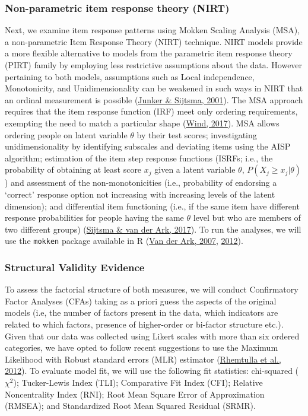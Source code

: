 \documentclass[
  ,doc,11pt, twoside,floatsintext]{apa6}
\begin{document}
\hypertarget{non-parametric-item-response-theory-nirt}{%
\subsubsection{Non-parametric item response theory (NIRT)}\label{non-parametric-item-response-theory-nirt}}

Next, we examine item response patterns using Mokken Scaling Analysis (MSA), a non-parametric Item Response Theory (NIRT) technique. NIRT models provide a more flexible alternative to models from the parametric item response theory (PIRT) family by employing less restrictive assumptions about the data. However pertaining to both models, assumptions such as Local independence, Monotonicity, and Unidimensionality can be weakened in such ways in NIRT that an ordinal measurement is possible (\protect\hyperlink{ref-junker2001}{Junker \& Sijtsma, 2001}). The MSA approach requires that the item response function (IRF) meet only ordering requirements, exempting the need to match a particular shape (\protect\hyperlink{ref-wind2017}{Wind, 2017}). MSA allows ordering people on latent variable \(\theta\) by their test scores; investigating unidimensionality by identifying subscales and deviating items using the AISP algorithm; estimation of the item step response functions (ISRFs; i.e., the probability of obtaining at least score \(x_j\) given a latent variable \(\theta\), \(P(X_j \ge x_j|\theta)\)) and assessment of the non-monotonicities (i.e., probability of endorsing a `correct' response option not increasing with increasing levels of the latent dimension); and differential item functioning (i.e., if the same item have different response probabilities for people having the same \(\theta\) level but who are members of two different groups) (\protect\hyperlink{ref-sijtsma2017}{Sijtsma \& van der Ark, 2017}). To run the analyses, we will use the \texttt{mokken} package available in R (\protect\hyperlink{ref-ark2007}{Van der Ark, 2007}, \protect\hyperlink{ref-ark2012}{2012}).

\hypertarget{structural-validity-evidence}{%
\subsubsection{Structural Validity Evidence}\label{structural-validity-evidence}}

To assess the factorial structure of both measures, we will conduct Confirmatory Factor Analyses (CFAs) taking as a priori guess the aspects of the original models (i.e, the number of factors present in the data, which indicators are related to which factors, presence of higher-order or bi-factor structure etc.). Given that our data was collected using Likert scales with more than six ordered categories, we have opted to follow recent suggestions to use the Maximum Likelihood with Robust standard errors (MLR) estimator (\protect\hyperlink{ref-rhemtulla2012}{Rhemtulla et al., 2012}). To evaluate model fit, we will use the following fit statistics: chi-squared (\(\chi^2\)); Tucker-Lewis Index (TLI); Comparative Fit Index (CFI); Relative Noncentrality Index (RNI); Root Mean Square Error of Approximation (RMSEA); and Standardized Root Mean Squared Residual (SRMR).
\end{document}
